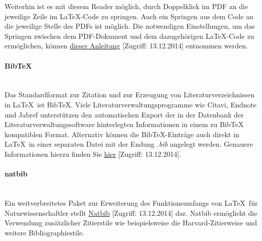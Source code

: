 Weiterhin ist es mit diesem Reader möglich, durch Doppelklick im PDF an die jeweilige Zeile im \LaTeX-Code zu springen. Auch ein Springen aus dem Code an die jeweilige Stelle des PDFs ist möglich. Die notwendigen Einstellungen, um das Springen zwischen dem PDF-Dokument und dem dazugehörigen \LaTeX-Code zu ermöglichen, können \href{http://robjhyndman.com/hyndsight/texstudio-sumatrapdf/}{dieser Anleitung} [Zugriff: 13.12.2014] entnommen werden.

%

\paragraph{BibTeX}\noindent\\
Das Standardformat zur Zitation und zur Erzeugung von Literaturverzeichnissen in \LaTeX\ ist BibTeX. Viele Literaturverwaltungsprogramme wie Citavi, Endnote und Jabref unterstützen den automatischen Export der in der Datenbank der Literaturverwaltungssoftware hinterlegten Informationen in einem zu BibTeX kompatiblen Format.
Alternativ können die BibTeX-Einträge auch direkt in \LaTeX\ in einer separaten Datei mit der Endung \emph{.bib} angelegt werden. Genauere Informationen hierzu finden Sie  \href{http://en.wikibooks.org/wiki/LaTeX/Bibliography_Management\#BibTeX}{hier} [Zugriff: 13.12.2014].

\paragraph{natbib}\noindent\\
Ein weitverbreitetes Paket zur Erweiterung des Funktionsumfangs von \LaTeX\ für Naturwissenschaftler stellt \href{http://ftp.gwdg.de/pub/ctan/macros/latex/contrib/natbib/natbib.pdf}{Natbib} [Zugriff: 13.12.2014] dar. Natbib ermöglicht die Verwendung zusätzlicher Zitierstile wie beispielsweise die \glqq Harvard\grqq-Zitierweise und weitere Bibliographiestile.

